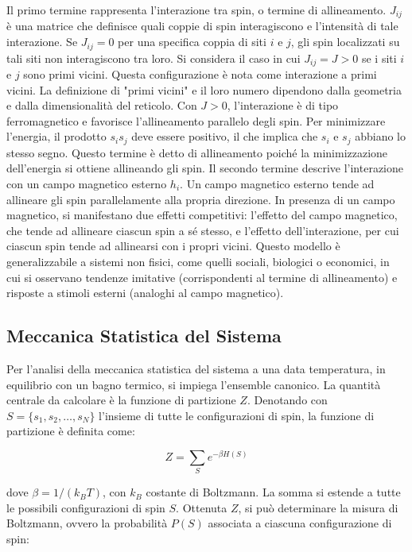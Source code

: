 Il primo termine rappresenta l'interazione tra spin, o termine di allineamento.
$J_{ij}$ è una matrice che definisce quali coppie di spin interagiscono e l'intensità di tale interazione. Se $J_{ij} = 0$ per una specifica coppia di siti $i$ e $j$, gli spin localizzati su tali siti non interagiscono tra loro.
Si considera il caso in cui $J_{ij} = J > 0$ se i siti $i$ e $j$ sono primi vicini. Questa configurazione è nota come interazione a primi vicini. La definizione di "primi vicini" e il loro numero dipendono dalla geometria e dalla dimensionalità del reticolo.
Con $J > 0$, l'interazione è di tipo ferromagnetico e favorisce l'allineamento parallelo degli spin. Per minimizzare l'energia, il prodotto $s_i s_j$ deve essere positivo, il che implica che $s_i$ e $s_j$ abbiano lo stesso segno. Questo termine è detto di allineamento poiché la minimizzazione dell'energia si ottiene allineando gli spin.
Il secondo termine descrive l'interazione con un campo magnetico esterno $h_i$. Un campo magnetico esterno tende ad allineare gli spin parallelamente alla propria direzione.
In presenza di un campo magnetico, si manifestano due effetti competitivi: l'effetto del campo magnetico, che tende ad allineare ciascun spin a sé stesso, e l'effetto dell'interazione, per cui ciascun spin tende ad allinearsi con i propri vicini.
Questo modello è generalizzabile a sistemi non fisici, come quelli sociali, biologici o economici, in cui si osservano tendenze imitative (corrispondenti al termine di allineamento) e risposte a stimoli esterni (analoghi al campo magnetico).

\subsection*{Meccanica Statistica del Sistema}
Per l'analisi della meccanica statistica del sistema a una data temperatura, in equilibrio con un bagno termico, si impiega l'ensemble canonico. La quantità centrale da calcolare è la funzione di partizione $Z$.
Denotando con $S = \{s_1, s_2, \dots, s_N\}$ l'insieme di tutte le configurazioni di spin, la funzione di partizione è definita come:

\begin{equation} \label{eq:ch16_14}
Z = \sum_S e^{-\beta H(S)} 
\end{equation}

dove $\beta = 1/(k_B T)$, con $k_B$ costante di Boltzmann. La somma si estende a tutte le possibili configurazioni di spin $S$.
Ottenuta $Z$, si può determinare la misura di Boltzmann, ovvero la probabilità $P(S)$ associata a ciascuna configurazione di spin:

